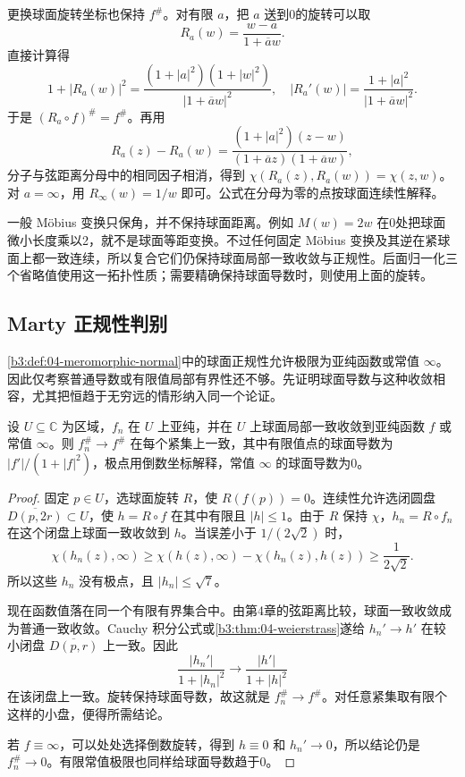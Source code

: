 \ProseParagraphBreak
更换球面旋转坐标也保持 \(f^\#\)。对有限 \(a\)，把 \(a\) 送到0的旋转可以取
\[
 R_a(w)=\frac{w-a}{1+\overline a w}.
\]
直接计算得
\[
 1+|R_a(w)|^2
 =\frac{(1+|a|^2)(1+|w|^2)}{|1+\overline a w|^2},
 \quad
 |R_a'(w)|=\frac{1+|a|^2}{|1+\overline a w|^2}.
\]
于是 \((R_a\circ f)^\#=f^\#\)。再用
\[
 R_a(z)-R_a(w)
 =\frac{(1+|a|^2)(z-w)}{(1+\overline a z)(1+\overline a w)},
\]
分子与弦距离分母中的相同因子相消，得到
\(\chi(R_a(z),R_a(w))=\chi(z,w)\)。对 \(a=\infty\)，用 \(R_\infty(w)=1/w\) 即可。公式在分母为零的点按球面连续性解释。

\ProseParagraphBreak
一般 Möbius 变换只保角，并不保持球面距离。例如 \(M(w)=2w\) 在0处把球面微小长度乘以2，就不是球面等距变换。不过任何固定 Möbius 变换及其逆在紧球面上都一致连续，所以复合它们仍保持球面局部一致收敛与正规性。后面归一化三个省略值使用这一拓扑性质；需要精确保持球面导数时，则使用上面的旋转。

\subsection{Marty 正规性判别}
\label{b3:subsec:140302}

\cref{b3:def:04-meromorphic-normal}中的球面正规性允许极限为亚纯函数或常值 \(\infty\)。因此仅考察普通导数或有限值局部有界性还不够。先证明球面导数与这种收敛相容，尤其把恒趋于无穷远的情形纳入同一个论证。

\begin{lemma}[球面收敛与导数]\label{b3:lem:14-spherical-derivative-limit}
设 \(U\subseteq\mathbb C\) 为区域，\(f_n\) 在 \(U\) 上亚纯，并在 \(U\) 上球面局部一致收敛到亚纯函数 \(f\) 或常值 \(\infty\)。则 \(f_n^\#\to f^\#\) 在每个紧集上一致，其中有限值点的球面导数为 \(|f'|/(1+|f|^2)\)，极点用倒数坐标解释，常值 \(\infty\) 的球面导数为0。
\end{lemma}
\begin{proof}
固定 \(p\in U\)，选球面旋转 \(R\)，使 \(R(f(p))=0\)。连续性允许选闭圆盘 \(\overline{D(p,2r)}\subset U\)，使 \(h=R\circ f\) 在其中有限且 \(|h|\le1\)。由于 \(R\) 保持 \(\chi\)，\(h_n=R\circ f_n\) 在这个闭盘上球面一致收敛到 \(h\)。当误差小于 \(1/(2\sqrt2)\) 时，
\[
 \chi(h_n(z),\infty)
 \ge\chi(h(z),\infty)-\chi(h_n(z),h(z))
 \ge\frac1{2\sqrt2}.
\]
所以这些 \(h_n\) 没有极点，且 \(|h_n|\le\sqrt7\)。

现在函数值落在同一个有限有界集合中。由第4章的弦距离比较，球面一致收敛成为普通一致收敛。Cauchy 积分公式或\cref{b3:thm:04-weierstrass}遂给 \(h_n'\to h'\) 在较小闭盘 \(\overline{D(p,r)}\) 上一致。因此
\[
 \frac{|h_n'|}{1+|h_n|^2}
 \longrightarrow\frac{|h'|}{1+|h|^2}
\]
在该闭盘上一致。旋转保持球面导数，故这就是 \(f_n^\#\to f^\#\)。对任意紧集取有限个这样的小盘，便得所需结论。

若 \(f\equiv\infty\)，可以处处选择倒数旋转，得到 \(h\equiv0\) 和 \(h_n'\to0\)，所以结论仍是 \(f_n^\#\to0\)。有限常值极限也同样给球面导数趋于0。
\end{proof}

